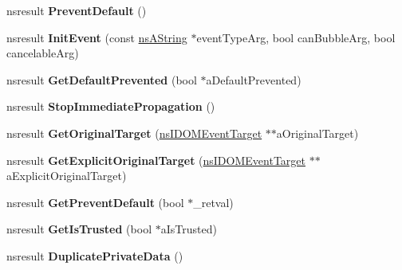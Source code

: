 \begin{DoxyCompactItemize}
nsresult {\bfseries Prevent\+Default} ()
\item 
\mbox{\label{interfacens_i_d_o_m_event_afa42e11f35a2ad287de0a7417c2aa34b}} 
nsresult {\bfseries Init\+Event} (const \hyperlink{structns_string_container}{ns\+A\+String} $\ast$event\+Type\+Arg, bool can\+Bubble\+Arg, bool cancelable\+Arg)
\item 
\mbox{\label{interfacens_i_d_o_m_event_ab324c11d362d26930a362269ade82b1d}} 
nsresult {\bfseries Get\+Default\+Prevented} (bool $\ast$a\+Default\+Prevented)
\item 
\mbox{\label{interfacens_i_d_o_m_event_a7290ca24db86c5c8fd960a6d949414ef}} 
nsresult {\bfseries Stop\+Immediate\+Propagation} ()
\item 
\mbox{\label{interfacens_i_d_o_m_event_afb0c7116b9015c03a4586e900e97c81f}} 
nsresult {\bfseries Get\+Original\+Target} (\hyperlink{interfacens_i_d_o_m_event_target}{ns\+I\+D\+O\+M\+Event\+Target} $\ast$$\ast$a\+Original\+Target)
\item 
\mbox{\label{interfacens_i_d_o_m_event_a8ec372e40b7d96d1c79ce09b842b019f}} 
nsresult {\bfseries Get\+Explicit\+Original\+Target} (\hyperlink{interfacens_i_d_o_m_event_target}{ns\+I\+D\+O\+M\+Event\+Target} $\ast$$\ast$a\+Explicit\+Original\+Target)
\item 
\mbox{\label{interfacens_i_d_o_m_event_a8a1213de7b270f677f8aadb112232c50}} 
nsresult {\bfseries Get\+Prevent\+Default} (bool $\ast$\+\_\+retval)
\item 
\mbox{\label{interfacens_i_d_o_m_event_a4eedb23986fb5dde52a88d9e2bdd3025}} 
nsresult {\bfseries Get\+Is\+Trusted} (bool $\ast$a\+Is\+Trusted)
\item 
\mbox{\label{interfacens_i_d_o_m_event_ab2715867aea9bdc0f3a5649e7b6bd28d}} 
nsresult {\bfseries Duplicate\+Private\+Data} ()
\item 
\mbox{\label{interfacens_i_d_o_m_event_ad47eeb31d8cba105e5a48f51727adf11}} 

\end{DoxyCompactItemize}
